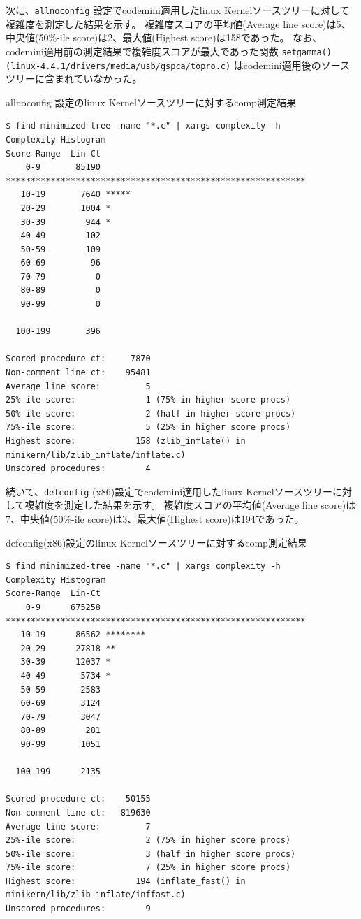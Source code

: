 \par
次に、\verb|allnoconfig| 設定で\acrshort{codemini}適用した\acrshort{linux} Kernelソースツリーに対して複雑度を測定した結果を示す。
複雑度スコアの平均値(Average line score)は5、中央値(50\%-ile score)は2、最大値(Highest score)は158であった。
なお、\acrshort{codemini}適用前の測定結果で複雑度スコアが最大であった関数 \verb|setgamma() (linux-4.4.1/drivers/media/usb/gspca/topro.c)|
は\acrshort{codemini}適用後のソースツリーに含まれていなかった。
\begin{itembox}[l]{allnoconfig 設定の\acrshort{linux} Kernelソースツリーに対する\acrshort{comp}測定結果}
\small
\begin{verbatim}
$ find minimized-tree -name "*.c" | xargs complexity -h
Complexity Histogram
Score-Range  Lin-Ct
    0-9       85190 ************************************************************
   10-19       7640 *****
   20-29       1004 *
   30-39        944 *
   40-49        102
   50-59        109
   60-69         96
   70-79          0
   80-89          0
   90-99          0

  100-199       396

Scored procedure ct:     7870
Non-comment line ct:    95481
Average line score:         5
25%-ile score:              1 (75% in higher score procs)
50%-ile score:              2 (half in higher score procs)
75%-ile score:              5 (25% in higher score procs)
Highest score:            158 (zlib_inflate() in minikern/lib/zlib_inflate/inflate.c)
Unscored procedures:        4
\end{verbatim}
\end{itembox}
\par
続いて、\verb|defconfig| (x86)設定で\acrshort{codemini}適用した\acrshort{linux} Kernelソースツリーに対して複雑度を測定した結果を示す。
複雑度スコアの平均値(Average line score)は7、中央値(50\%-ile score)は3、最大値(Highest score)は194であった。
\begin{itembox}[l]{defconfig(x86)設定の\acrshort{linux} Kernelソースツリーに対する\acrshort{comp}測定結果}
\small
\begin{verbatim}
$ find minimized-tree -name "*.c" | xargs complexity -h
Complexity Histogram
Score-Range  Lin-Ct
    0-9      675258 ************************************************************
   10-19      86562 ********
   20-29      27818 **
   30-39      12037 *
   40-49       5734 *
   50-59       2583
   60-69       3124
   70-79       3047
   80-89        281
   90-99       1051

  100-199      2135

Scored procedure ct:    50155
Non-comment line ct:   819630
Average line score:         7
25%-ile score:              2 (75% in higher score procs)
50%-ile score:              3 (half in higher score procs)
75%-ile score:              7 (25% in higher score procs)
Highest score:            194 (inflate_fast() in minikern/lib/zlib_inflate/inffast.c)
Unscored procedures:        9
\end{verbatim}
\end{itembox}
